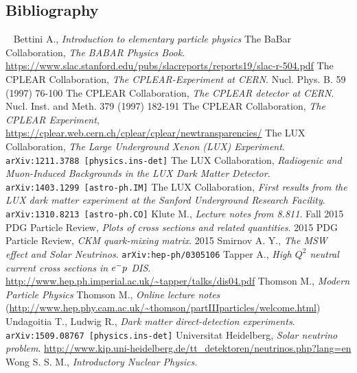 \begin{appendices}
\section{Bibliography}
~
\bibspace Bettini A., \emph{Introduction to elementary particle physics}
\bibspace The BaBar Collaboration, \emph{The BABAR Physics Book}. \url{https://www.slac.stanford.edu/pubs/slacreports/reports19/slac-r-504.pdf}
\bibspace The CPLEAR Collaboration, \emph{The CPLEAR-Experiment at CERN}. Nucl. Phys. B. 59 (1997) 76-100
\bibspace The CPLEAR Collaboration, \emph{The CPLEAR detector at CERN}. Nucl. Inst. and Meth. 379 (1997) 182-191
\bibspace The CPLEAR Collaboration, \emph{The CPLEAR Experiment}, \\ \url{https://cplear.web.cern.ch/cplear/cplear/newtransparencies/}
\bibspace The LUX Collaboration, \emph{The Large Underground Xenon (LUX) Experiment}.\\ \verb|arXiv:1211.3788 [physics.ins-det]|
\bibspace The LUX Collaboration, \emph{Radiogenic and Muon-Induced Backgrounds in the LUX Dark Matter Detector}.\\ \verb|arXiv:1403.1299 [astro-ph.IM]|
\bibspace The LUX Collaboration, \emph{First results from the LUX dark matter experiment at the Sanford Underground Research Facility}. \verb|arXiv:1310.8213 [astro-ph.CO]|
\bibspace Klute M., \emph{Lecture notes from 8.811}. Fall 2015
\bibspace PDG Particle Review, \emph{Plots of cross sections and related quantities}. 2015
\bibspace PDG Particle Review, \emph{CKM quark-mixing matrix}. 2015
\bibspace Smirnov A. Y., \emph{The MSW effect and Solar Neutrinos}. \verb|arXiv:hep-ph/0305106|
\bibspace Tapper A., \emph{High $Q^2$ neutral current cross sections in $e^{-} p$ DIS}. \url{http://www.hep.ph.imperial.ac.uk/~tapper/talks/dis04.pdf}
\bibspace Thomson M., \emph{Modern Particle Physics}
\bibspace Thomson M., \emph{Online lecture notes} (\url{http://www.hep.phy.cam.ac.uk/~thomson/partIIIparticles/welcome.html})
\bibspace Undagoitia T., Ludwig R., \emph{Dark matter direct-detection experiments}.  \verb|arXiv:1509.08767 [physics.ins-det]|
\bibspace Universitat Heidelberg, \emph{Solar neutrino problem}. \url{http://www.kip.uni-heidelberg.de/tt_detektoren/neutrinos.php?lang=en}
\bibspace Wong S. S. M., \emph{Introductory Nuclear Physics}.

\end{appendices}


